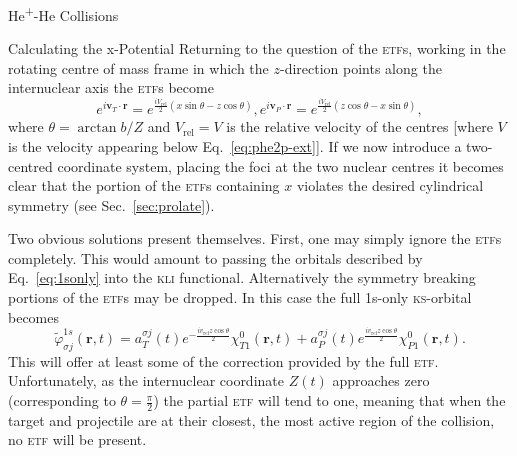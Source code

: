 \documentclass[letterpaper, 11 pt]{report}
\begin{document}
\begin{chapter}{\texorpdfstring{He\textsuperscript{+}}{He+}-He Collisions \label{chap:hephe}}
\begin{section}{Calculating the x-Potential \label{sec:pot}}
      Returning to the question of the \textsc{etf}s, working in the rotating centre of mass frame in
      which the $z$-direction points along the internuclear axis the \textsc{etf}s become
      \begin{subequations} \label{eq:etf}
         \begin{equation} \label{eq:etfT}
            e^{i \mathbf{v}_T \cdot \mathbf{r}} =
             e^{\frac{i V_\mathrm{rel}}{2} (x \sin \theta - z \cos \theta)},
         \end{equation}
         \begin{equation} \label{eq:etfP}
            e^{i \mathbf{v}_P \cdot \mathbf{r}} =
             e^{\frac{i V_\mathrm{rel}}{2} (z \cos \theta - x \sin \theta)},
         \end{equation}
      \end{subequations}
      where $\theta = \arctan b/Z$ and $V_\mathrm{rel} = V$ is the relative velocity of the centres
      [where $V$ is the velocity appearing below Eq.~\eqref{eq:phe2p-ext}]. If we now introduce a
      two-centred coordinate system, placing the foci at the two nuclear centres it becomes clear that
      the portion of the \textsc{etf}s containing $x$ violates the desired cylindrical symmetry (see
      Sec.~\ref{sec:prolate}).

      Two obvious solutions present themselves. First, one may simply ignore the \textsc{etf}s
      completely. This would amount to passing the orbitals described by Eq.~\eqref{eq:1sonly} into
      the \textsc{kli} functional. Alternatively the symmetry breaking portions of the \textsc{etf}s
      may be dropped. In this case the full 1s-only \textsc{ks}-orbital becomes
      \begin{equation} \label{eq:1sonlyetf}
         \tilde{\varphi}_{\sigma j}^{1s} (\mathbf{r},t) =
                       a^{\sigma j}_T (t)  e^{- \frac{i v_\mathrm{rel} z \cos \theta}{2}}
                                           \chi^{0}_{T1} (\mathbf{r},t)
                     + a^{\sigma j}_P (t)  e^{  \frac{i v_\mathrm{rel} z \cos \theta}{2}}
                                           \chi^{0}_{P1} (\mathbf{r},t).
      \end{equation}
      This will offer at least some of the correction provided by the full \textsc{etf}. Unfortunately,
      as the internuclear coordinate $Z(t)$ approaches zero (corresponding to $\theta = \frac{\pi}{2}$)
      the partial \textsc{etf} will tend to one, meaning that when the target and projectile are at
      their closest, the most active region of the collision, no \textsc{etf} will be present. 


\end{section}
\end{chapter}
\end{document}
